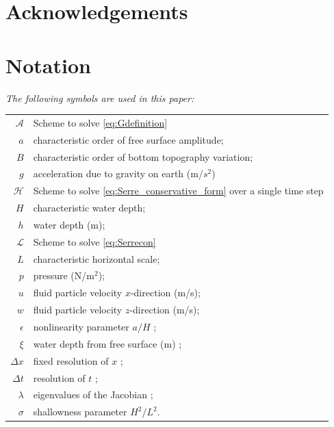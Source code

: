 \documentclass[SingleSpace,12pt]{Serre_ASCE}
\begin{document}
\section{Acknowledgements}




\section{Notation}
\emph{The following symbols are used in this paper:}%
\nopagebreak
\begin{longtable}{r  @{\hspace{1em}=\hspace{1em}}  l}
$\mathcal{A}$		& Scheme to solve \eqref{eq:Gdefinition} \\
$a$					& characteristic order of free surface amplitude; \\
$B$					& characteristic order of bottom topography variation;\\
$g$					& acceleration due to gravity on earth (m/$s^2$) \\
$\mathcal{H}$		& Scheme to solve \eqref{eq:Serre_conservative_form} over a single time step \\
$H$					& characteristic water depth; \\
$h$					& water depth (m); \\
$\mathcal{L}$		& Scheme to solve \eqref{eq:Serrecon} \\
$L$					& characteristic horizontal scale; \\
$p$                 & pressure (N/m$^2$); \\
$u$                 & fluid particle velocity $x$-direction (m/s); \\
$w$                 & fluid particle velocity $z$-direction (m/s); \\
$\epsilon$			& nonlinearity parameter $a/H$ ;\\
$\xi$				& water depth from free surface (m) ;\\
$\Delta x$			& fixed resolution of $x$ ;\\
$\Delta t$			& resolution of $t$ ;\\
$\lambda$			& eigenvalues of the Jacobian ;\\
$\sigma$            & shallowness parameter $H^2/L^2$.

\end{longtable}
\end{document}
